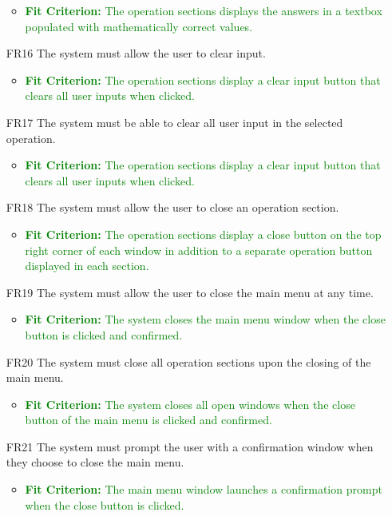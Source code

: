 \documentclass[12pt, titlepage]{article}
\begin{document}
\begin{enumerate}
\begin{itemize}
  \item \textcolor{Green}{\textbf{Fit Criterion:} The operation sections displays the answers in a textbox populated with mathematically correct values.}
\end{itemize}
\item [FR16] The system must allow the user to clear input.
\begin{itemize}
  \item \textcolor{Green}{\textbf{Fit Criterion:} The operation sections display a clear input button that clears all user inputs when clicked.}
\end{itemize}
\item [FR17] The system must be able to clear all user input in the selected operation.
\begin{itemize}
  \item \textcolor{Green}{\textbf{Fit Criterion:} The operation sections display a clear input button that clears all user inputs when clicked.}
\end{itemize}
\item [FR18] The system must allow the user to close an operation section.
\begin{itemize}
  \item \textcolor{Green}{\textbf{Fit Criterion:} The operation sections display a close button on the top right corner of each window in addition to a separate operation button displayed in each section.}
\end{itemize}
\item [FR19] The system must allow the user to close the main menu at any time.
\begin{itemize}
  \item \textcolor{Green}{\textbf{Fit Criterion:} The system closes the main menu window when the close button is clicked and confirmed.}
\end{itemize}
\item [FR20] The system must close all operation sections upon the closing of the main menu.
\begin{itemize}
  \item \textcolor{Green}{\textbf{Fit Criterion:} The system closes all open windows when the close button of the main menu is clicked and confirmed.}
\end{itemize}
\item [FR21] The system must prompt the user with a confirmation window when they choose to close the main menu.
\begin{itemize}
  \item \textcolor{Green}{\textbf{Fit Criterion:} The main menu window launches a confirmation prompt when the close button is clicked.}
\end{itemize}

\end{enumerate}
\end{document}
